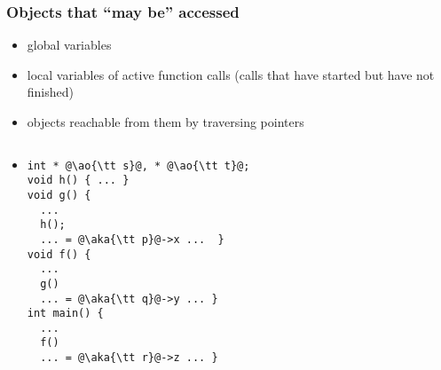 \documentclass[12pt,dvipdfmx]{beamer}
\newif\ifja
\newif\ifeng
\newcommand{\ore}[1]{{\color{orange}#1}}
\newcommand{\ao}[1]{{\color{blue}#1}}
\newcommand{\aka}[1]{{\color{red}#1}}
\begin{document}
\begin{frame}[fragile]
\frametitle{Objects that ``may be'' accessed}
{\small
\begin{itemize}
\item \ao{global variables}
\item \aka{local variables} of
  active function calls (calls that have started but have not finished)
\item<2->\ore{objects reachable from them by traversing pointers}
\end{itemize}}

\begin{columns}
\begin{column}{0.35\textwidth}
  \begin{itemize}
  \item []
\begin{lstlisting}[]
int * @\ao{\tt s}@, * @\ao{\tt t}@;
void h() { ... }
void g() {
  ... 
  h();
  ... = @\aka{\tt p}@->x ...  }
void f() {
  ... 
  g()
  ... = @\aka{\tt q}@->y ... }
int main() {
  ... 
  f()
  ... = @\aka{\tt r}@->z ... }
\end{lstlisting}
\end{itemize}
\end{column}

\begin{column}{0.65\textwidth}
\begin{center}
%
\end{center}
\end{column}
\end{columns}
\end{frame}
\fi

\ifja
\section{基本原理と用語}
\fi
\ifeng
\end{document}
